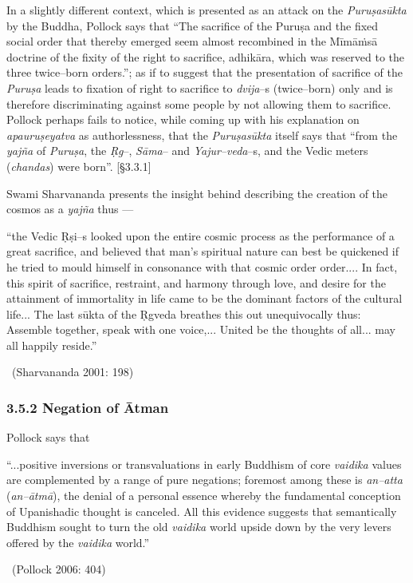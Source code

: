 In a slightly different context, which is presented as an attack on the \textit{Puruṣasūkta} by the Buddha, Pollock says that “The sacrifice of the Puruṣa and the fixed social order that thereby emerged seem almost recombined in the Mīmāṁsā doctrine of the fixity of the right to sacrifice, adhikāra, which was reserved to the three twice–born orders.”; as if to suggest that the presentation of sacrifice of the \textit{Puruṣa} leads to fixation of right to sacrifice to \textit{dvija}–s (twice–born) only and is therefore discriminating against some people by not allowing them to sacrifice. Pollock perhaps fails to notice, while coming up with his explanation on \textit{apauruṣeyatva} as authorlessness, that the \textit{Puruṣasūkta} itself says that “from the \textit{yajña} of \textit{Puruṣa}, the \textit{Ṛg}–, \textit{Sāma}– and \textit{Yajur–veda}–s, and the Vedic meters (\textit{chandas}) were born”. [§3.3.1]

Swami Sharvananda presents the insight behind describing the creation of the cosmos as a \textit{yajña }thus —

\begin{myquote}
“the Vedic Ṛṣi–s looked upon the entire cosmic process as the performance of a great sacrifice, and believed that man’s spiritual nature can best be quickened if he tried to mould himself in consonance with that cosmic order order.... In fact, this spirit of sacrifice, restraint, and harmony through love, and desire for the attainment of immortality in life came to be the dominant factors of the cultural life... The last sūkta of the Ṛgveda breathes this out unequivocally thus: Assemble together, speak with one voice,... United be the thoughts of all... may all happily reside.” 

~\hfill (Sharvananda 2001: 198)
\end{myquote}


\subsubsection*{3.5.2 Negation of Ātman}

Pollock says that

\begin{myquote}
“...positive inversions or transvaluations in early Buddhism of core \textit{vaidika} values are complemented by a range of pure negations; foremost among these is \textit{an–atta} (\textit{an–ātmā}), the denial of a personal essence whereby the fundamental conception of Upanishadic thought is canceled. All this evidence suggests that semantically Buddhism sought to turn the old \textit{vaidika} world upside down by the very levers offered by the \textit{vaidika} world.” 

~\hfill (Pollock 2006: 404)
\end{myquote}

